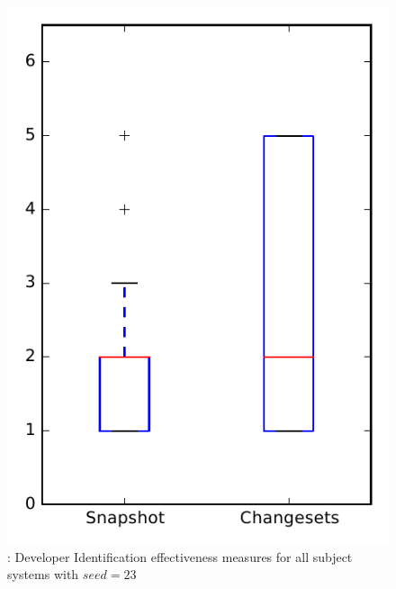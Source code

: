 
\begin{figure}
\centering
\includegraphics[height=0.4\textheight]{figures/dit_seed/rq1_overview_23}
\caption{\rtwo: Developer Identification effectiveness measures for all subject systems with $seed=23$}
\label{fig:dit_seed:rq1:overview}
\end{figure}
